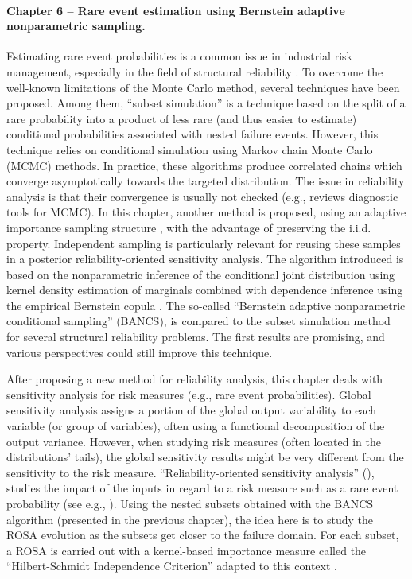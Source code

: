 \paragraph{Chapter 6 -- Rare event estimation using Bernstein adaptive nonparametric sampling.} 
Estimating rare event probabilities is a common issue in industrial risk management, especially in the field of structural reliability \citep{MorioBalesdent2015}. 
To overcome the well-known limitations of the Monte Carlo method, several techniques have been proposed. 
Among them, ``subset simulation'' \citep{AuBeck2001} is a technique based on the split of a rare probability into a product of less rare (and thus easier to estimate) conditional probabilities associated with nested failure events. 
However, this technique relies on conditional simulation using Markov chain Monte Carlo (MCMC) methods. 
In practice, these algorithms produce correlated chains which converge asymptotically towards the targeted distribution. 
The issue in reliability analysis is that their convergence is usually not checked (e.g., \citealp{roy_2020_mcmc_convergence} reviews diagnostic tools for MCMC).    
In this chapter, another method is proposed, using an adaptive importance sampling structure \citep{zhang_1996_NIS}, with the advantage of preserving the i.i.d. property. 
Independent sampling is particularly relevant for reusing these samples in a posterior reliability-oriented sensitivity analysis. 
The algorithm introduced is based on the nonparametric inference of the conditional joint distribution using kernel density estimation of marginals combined with dependence inference using the empirical Bernstein copula \citep{sancetta_satchell_2004}. 
The so-called ``Bernstein adaptive nonparametric conditional sampling'' (BANCS), is compared to the subset simulation method for several structural reliability problems. 
The first results are promising, and various perspectives could still improve this technique.

After proposing a new method for reliability analysis, this chapter deals with sensitivity analysis for risk measures (e.g., rare event probabilities). 
Global sensitivity analysis \citep{daveiga_iooss_2021} assigns a portion of the global output variability to each variable (or group of variables), often using a functional decomposition of the output variance. 
However, when studying risk measures (often located in the distributions' tails), the global sensitivity results might be very different from the sensitivity to the risk measure. 
``Reliability-oriented sensitivity analysis'' (), studies the impact of the inputs in regard to a risk measure such as a rare event probability (see e.g., \citealp{chabridon_2018_thesis}). 
Using the nested subsets obtained with the BANCS algorithm (presented in the previous chapter), the idea here is to study the ROSA evolution as the subsets get closer to the failure domain. 
For each subset, a ROSA is carried out with a kernel-based importance measure called the ``Hilbert-Schmidt Independence Criterion'' adapted to this context \citep{daveiga_2015,marrel_chabridon_2021}. 

